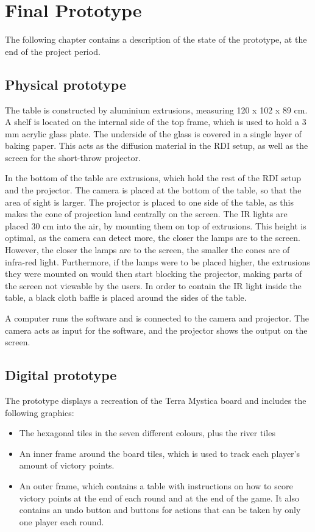 \chapter{Final Prototype}\label{ch:finproduct}
The following chapter contains a description of the state of the prototype, at the end of the project period.

\section{Physical prototype}
The table is constructed by aluminium extrusions, measuring 120 x 102 x 89 cm. A shelf is located on the internal side of the top frame, which is used to hold a 3 mm acrylic glass plate. The underside of the glass is covered in a single layer of baking paper. This acts as the diffusion material in the RDI setup, as well as the screen for the short-throw projector.

In the bottom of the table are extrusions, which hold the rest of the RDI setup and the projector. The camera is placed at the bottom of the table, so that the area of sight is larger. The projector is placed to one side of the table, as this makes the cone of projection land centrally on the screen. The IR lights are placed 30 cm into the air, by mounting them on top of extrusions. This height is optimal, as the camera can detect more, the closer the lamps are to the screen. However, the closer the lamps are to the screen, the smaller the cones are of infra-red light.  Furthermore, if the lamps were to be placed higher, the extrusions they were mounted on would then start blocking the projector, making parts of the screen not viewable by the users. In order to contain the IR light inside the table, a black cloth baffle is placed around the sides of the table.

A computer runs the software and is connected to the camera and projector. The camera acts as input for the software, and the projector shows the output on the screen.

\section{Digital prototype}
The prototype displays a recreation of the Terra Mystica board and includes the following graphics:
\begin{itemize}
	\item The hexagonal tiles in the seven different colours, plus the river tiles
	\item An inner frame around the board tiles, which is used to track each player's amount of victory points.
	\item An outer frame, which contains a table with instructions on how to score victory points at the end of each round and at the end of the game. It also contains an undo button and buttons for actions that can be taken by only one player each round.
\end{itemize}

